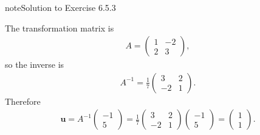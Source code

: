 \documentclass[letterpaper,10pt,english]{jupyterBook}
\begin{document}
\begin{sphinxadmonition}{note}{Solution to Exercise 6.5.3}



\sphinxAtStartPar
The transformation matrix is
\begin{equation*}
\begin{split} A = \begin{pmatrix} 1 & -2 \\ 2 & 3 \end{pmatrix}, \end{split}
\end{equation*}
\sphinxAtStartPar
so the inverse is
\begin{equation*}
\begin{split}  A^{-1} = \frac{1}{7}
\begin{pmatrix} 
    3 & 2 \\
    -2 & 1
\end{pmatrix}. \end{split}
\end{equation*}
\sphinxAtStartPar
Therefore
\begin{equation*}
\begin{split} \mathbf{u} = A^{-1} 
\begin{pmatrix} -1 \\ 5 \end{pmatrix} =  \frac{1}{7}
\begin{pmatrix} 
    3 & 2 \\
    -2 & 1
\end{pmatrix}
\begin{pmatrix} -1 \\ 5 \end{pmatrix} = 
\begin{pmatrix} 1 \\ 1 \end{pmatrix}. \end{split}
\end{equation*}\end{sphinxadmonition}
 \label{_pages/A6_Linear_transformations_exercises_solutions:_pages/A6_Linear_transformations_exercises_solutions-solution-3}
\end{document}
